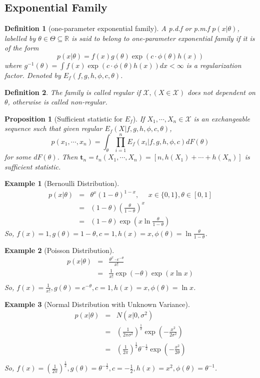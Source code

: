 \documentclass[11pt]{article}
\def\t{{\bm t}}
\newtheorem{definition}{Definition}[section]
\newtheorem{proposition}{Proposition}[section]
\newtheorem{example}{Example}[section]
\begin{document}
\subsection{Exponential Family}
\begin{definition}[one-parameter exponential family]
A p.d.f or p.m.f $p(x|\theta)$, labelled by $\theta\in\Theta\subseteq\mathbb{R}$ is said to belong to one-parameter exponential family if it is of the form
$$
p(x|\theta) = f(x) g(\theta)\exp \left (c\cdot\phi(\theta)h(x)\right ) 
$$
where $g^{-1}(\theta) = \int f(x)\exp\left(c\cdot\phi(\theta)h(x)\right )dx < \infty$  is a  regularization factor. Denoted by $E_f(f,g,h,\phi, c,\theta)$.
\end{definition}
\begin{definition}
The family is called regular if $\mathcal{X}, (X\in\mathcal{X})$ does not dependent on $\theta$, otherwise is called non-regular.
\end{definition}
\begin{proposition}[Sufficient statistic for $E_f$] If $X_1, \cdots, X_n \in \mathcal{X}$ is an exchangeable sequence such that given regular $E_f(X|f,g,h,\phi,c,\theta)$, 
$$
p(x_1,\cdots,x_n) = \int_{\theta}\prod_{i=1}^{n}E_f(x_i|f,g,h,\phi,c)dF(\theta)
$$
for some $dF(\theta)$. Then $\t_n=t_n(X_1,\cdots,X_n)=[n, h(X_1)+\cdots+h(X_n)]$ is sufficient statistic.
\end{proposition}
\begin{example}[Bernoulli Distribution]
\begin{eqnarray*}
p(x|\theta) &=& \theta^{x}(1-\theta)^{1-x}, \,\,\,\,\,\,\,\, x\in\{0,1\}, \theta\in[0,1] \\
&=& (1-\theta)\left(\frac{\theta}{1-\theta}\right)^{x} \\
&=& (1-\theta)\exp(x\ln\frac{\theta}{1-\theta})
\end{eqnarray*}
So, $f(x) = 1, g(\theta) = 1-\theta, c=1, h(x) = x, \phi(\theta) = \ln\frac{\theta}{1-\theta}$.
\end{example}
\begin{example}[Poisson Distribution]
\begin{eqnarray*}
p(x|\theta) &=& \frac{\theta^x\cdot e^{-\theta}}{x!} \\
&=& \frac{1}{x!}\exp(-\theta)\exp(x\ln x) \\
\end{eqnarray*}
So, $f(x) = \frac{1}{x!}, g(\theta) = e^{-\theta}, c=1, h(x) = x, \phi(\theta) = \ln x$.
\end{example}
\begin{example}[Normal Distribution with Unknown Variance]
\begin{eqnarray*}
p(x|\theta) &=& N(x|0,\sigma^2) \\
&=& \left(\frac{1}{2\pi\sigma^2}\right)^{\frac{1}{2}}\exp(-\frac{x^2}{2\sigma^2}) \\
&=& \left(\frac{1}{2\pi}\right)^{\frac{1}{2}}\theta^{-\frac{1}{2}}\exp(-\frac{x^2}{2\theta}) \\
\end{eqnarray*}
So, $f(x) = \left(\frac{1}{2\pi}\right)^{\frac{1}{2}}, g(\theta) = \theta^{-\frac{1}{2}}, c=-\frac{1}{2}, h(x) = x^2, \phi(\theta) = \theta^{-1}$.
\end{example}
\end{document}
